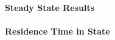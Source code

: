 \paragraph{Steady State Results}

\paragraph{Residence Time in State}

\begin{equation*} \begin{split}
\end{split} \end{equation*}





